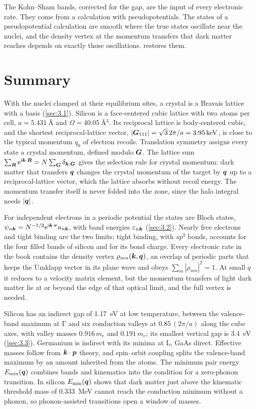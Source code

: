 The Kohn--Sham bands, corrected for the gap, are the input of every electronic rate. They come from a calculation with pseudopotentials. The states of a pseudopotential calculation are smooth where the true states oscillate near the nuclei, and the density vertex at the momentum transfers that dark matter reaches depends on exactly those oscillations.  restores them.

\section*{Summary}

With the nuclei clamped at their equilibrium sites, a crystal is a Bravais lattice with a basis (\cref{sec:3.1}). Silicon is a face-centered cubic lattice with two atoms per cell, $a = \SI{5.431}{\angstrom}$ and $\Omega = \SI{40.05}{\angstrom^3}$. Its reciprocal lattice is body-centered cubic, and the shortest reciprocal-lattice vector, $|\bm{G}_{111}| = \sqrt3\,2\pi/a = \SI{3.95}{keV}$, is close to the typical momentum $q_0$ of electron recoils. Translation symmetry assigns every state a crystal momentum, defined modulo $\bm{G}$. The lattice sum $\sum_{\bm{R}}\mathrm{e}^{\mathrm{i}\bm{k}\cdot\bm{R}} = N\sum_{\bm{G}}\delta_{\bm{k},\bm{G}}$ gives the selection rule for crystal momentum: dark matter that transfers $\bm{q}$ changes the crystal momentum of the target by $\bm{q}$ up to a reciprocal-lattice vector, which the lattice absorbs without recoil energy. The momentum transfer itself is never folded into the zone, since the halo integral needs $|\bm{q}|$.

For independent electrons in a periodic potential the states are Bloch states, $\psi_{n\bm{k}} = N^{-1/2}\mathrm{e}^{\mathrm{i}\bm{k}\cdot\bm{r}}u_{n\bm{k}}$, with band energies $\varepsilon_{n\bm{k}}$ (\cref{sec:3.2}). Nearly free electrons and tight binding are the two limits; tight binding, with $sp^3$ bonds, accounts for the four filled bands of silicon and for its bond charge. Every electronic rate in the book contains the density vertex $\rho_{mn}(\bm{k},\bm{q})$, an overlap of periodic parts that keeps the Umklapp vector in its plane wave and obeys $\sum_m|\rho_{mn}|^2 = 1$. At small $q$ it reduces to a velocity matrix element, but the momentum transfers of light dark matter lie at or beyond the edge of that optical limit, and the full vertex is needed.

Silicon has an indirect gap of \SI{1.17}{eV} at low temperature, between the valence-band maximum at $\mathrm{\Gamma}$ and six conduction valleys at $0.85\,(2\pi/a)$ along the cube axes, with valley masses $0.916\,m_e$ and $0.191\,m_e$; its smallest vertical gap is \SI{3.4}{eV} (\cref{sec:3.3}). Germanium is indirect with its minima at L, GaAs direct. Effective masses follow from $\bm{k}\cdot\bm{p}$ theory, and spin--orbit coupling splits the valence-band maximum by an amount inherited from the atoms. The minimum pair energy $E_{\mathrm{min}}(\bm{q})$ combines bands and kinematics into the condition for a zero-phonon transition. In silicon $E_{\mathrm{min}}(\bm{q})$ shows that dark matter just above the kinematic threshold mass of \SI{0.333}{MeV} cannot reach the conduction minimum without a phonon, so phonon-assisted transitions open a window of masses.

